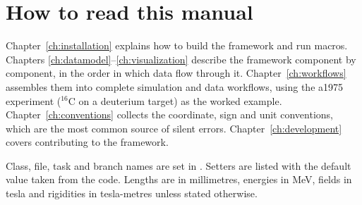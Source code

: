 \section{How to read this manual}

Chapter~\ref{ch:installation} explains how to build the framework and run macros. Chapters
\ref{ch:datamodel}--\ref{ch:visualization} describe the framework component by component, in the order in which
data flow through it. Chapter~\ref{ch:workflows} assembles them into complete simulation and data workflows, using
the a1975 experiment ($^{16}$C on a deuterium target) as the worked example. Chapter~\ref{ch:conventions} collects the
coordinate, sign and unit conventions, which are the most common source of silent errors. Chapter~\ref{ch:development}
covers contributing to the framework.

Class, file, task and branch names are set in . Setters are listed with the default value taken
from the code. Lengths are in millimetres, energies in MeV, fields in tesla and rigidities in tesla-metres unless
stated otherwise.
